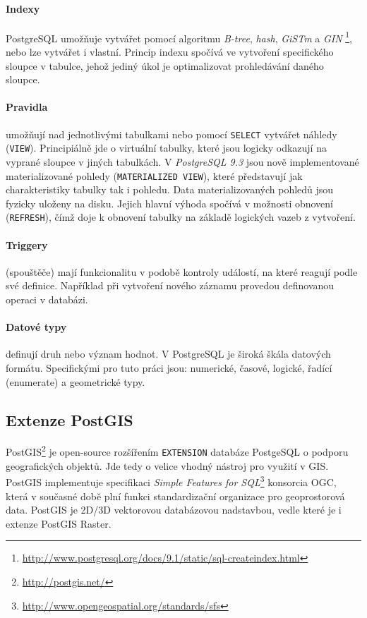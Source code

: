 \documentclass[a4paper,12pt,oneside]{report}
\begin{document}
\paragraph*{Indexy} PostgreSQL umožňuje vytvářet pomocí algoritmu \textit{B-tree}, \textit{hash}, \textit{GiSTm} a \textit{GIN} \footnote{\url{http://www.postgresql.org/docs/9.1/static/sql-createindex.html}}, nebo lze vytvářet i vlastní. Princip indexu spočívá ve vytvoření specifického sloupce v tabulce, jehož jediný úkol je optimalizovat prohledávání daného sloupce. 
\paragraph*{Pravidla} umožňují nad jednotlivými tabulkami nebo pomocí \texttt{SELECT} vytvářet náhledy (\texttt{VIEW}). Principiálně jde o virtuální tabulky, které jsou logicky odkazují na vyprané sloupce v jiných tabulkách. V \textit{PostgreSQL 9.3 } jsou nově implementované materializované pohledy (\texttt{MATERIALIZED VIEW}), které představují  jak charakteristiky tabulky  tak i pohledu. Data materializovaných pohledů jsou fyzicky uloženy na disku. Jejich hlavní výhoda spočívá v možnosti obnovení (\texttt{REFRESH}), čímž doje k obnovení tabulky na základě logických vazeb z vytvoření.
\paragraph*{Triggery} (spouštěče) mají funkcionalitu v podobě kontroly událostí, na které reagují podle své definice. Například při vytvoření nového záznamu provedou definovanou operaci v databázi. 
\paragraph*{Datové typy} definují druh nebo význam hodnot. V PostgreSQL je široká škála datových formátu. Specifickými pro tuto práci jsou: numerické, časové, logické, řadící (enumerate) a geometrické typy.

\subsection{Extenze PostGIS}
PostGIS\footnote{\url{http://postgis.net/}} je open-source rozšířením \texttt{EXTENSION} databáze PostgeSQL o podporu geografických objektů. Jde tedy o velice vhodný   nástroj pro využití v GIS. PostGIS implementuje specifikaci \textit{Simple Features for SQL}\footnote{\url{http://www.opengeospatial.org/standards/sfs} } konsorcia \acs{OGC}, která v současné době plní funkci standardizační organizace pro geoprostorová data. PostGIS je 2D/3D  vektorovou databázovou nadstavbou, vedle které je i extenze PostGIS Raster. 
\end{document}
